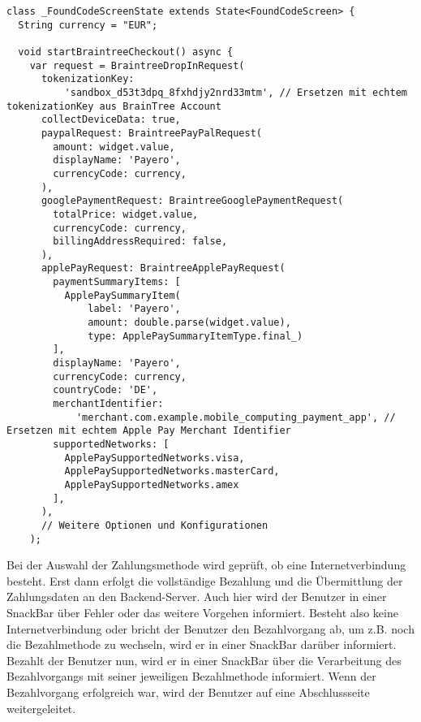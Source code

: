 \begin{lstlisting}[caption={BrainTree Bezahlmethoden}]
  class _FoundCodeScreenState extends State<FoundCodeScreen> {
  String currency = "EUR";

  void startBraintreeCheckout() async {
    var request = BraintreeDropInRequest(
      tokenizationKey:
          'sandbox_d53t3dpq_8fxhdjy2nrd33mtm', // Ersetzen mit echtem tokenizationKey aus BrainTree Account
      collectDeviceData: true,
      paypalRequest: BraintreePayPalRequest(
        amount: widget.value,
        displayName: 'Payero',
        currencyCode: currency,
      ),
      googlePaymentRequest: BraintreeGooglePaymentRequest(
        totalPrice: widget.value,
        currencyCode: currency,
        billingAddressRequired: false,
      ),
      applePayRequest: BraintreeApplePayRequest(
        paymentSummaryItems: [
          ApplePaySummaryItem(
              label: 'Payero',
              amount: double.parse(widget.value),
              type: ApplePaySummaryItemType.final_)
        ],
        displayName: 'Payero',
        currencyCode: currency,
        countryCode: 'DE',
        merchantIdentifier:
            'merchant.com.example.mobile_computing_payment_app', // Ersetzen mit echtem Apple Pay Merchant Identifier
        supportedNetworks: [
          ApplePaySupportedNetworks.visa,
          ApplePaySupportedNetworks.masterCard,
          ApplePaySupportedNetworks.amex
        ],
      ),
      // Weitere Optionen und Konfigurationen
    );  
\end{lstlisting}

Bei der Auswahl der Zahlungsmethode wird geprüft, ob eine Internetverbindung besteht.
Erst dann erfolgt die vollständige Bezahlung und die Übermittlung der Zahlungsdaten an den Backend-Server.
Auch hier wird der Benutzer in einer SnackBar über Fehler oder das weitere Vorgehen informiert.
Besteht also keine Internetverbindung oder bricht der Benutzer den Bezahlvorgang ab, um z.B. noch die Bezahlmethode zu wechseln, wird er in einer SnackBar darüber informiert.
Bezahlt der Benutzer nun, wird er in einer SnackBar über die Verarbeitung des Bezahlvorgangs mit seiner jeweiligen Bezahlmethode informiert.
Wenn der Bezahlvorgang erfolgreich war, wird der Benutzer auf eine Abschlussseite weitergeleitet.

